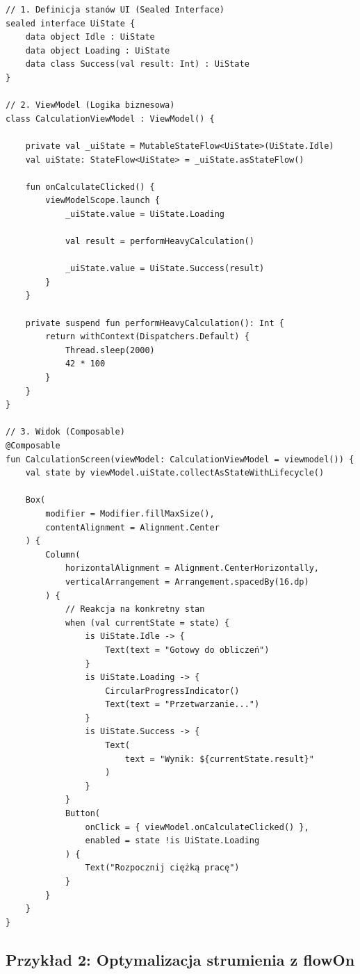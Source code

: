 \begin{verbatim}
// 1. Definicja stanów UI (Sealed Interface)
sealed interface UiState {
    data object Idle : UiState                    
    data object Loading : UiState                 
    data class Success(val result: Int) : UiState 
}

// 2. ViewModel (Logika biznesowa)
class CalculationViewModel : ViewModel() {

    private val _uiState = MutableStateFlow<UiState>(UiState.Idle)
    val uiState: StateFlow<UiState> = _uiState.asStateFlow()

    fun onCalculateClicked() {
        viewModelScope.launch {
            _uiState.value = UiState.Loading

            val result = performHeavyCalculation()

            _uiState.value = UiState.Success(result)
        }
    }

    private suspend fun performHeavyCalculation(): Int {
        return withContext(Dispatchers.Default) {
            Thread.sleep(2000) 
            42 * 100
        }
    }
}

// 3. Widok (Composable)
@Composable
fun CalculationScreen(viewModel: CalculationViewModel = viewmodel()) {
    val state by viewModel.uiState.collectAsStateWithLifecycle()

    Box(
        modifier = Modifier.fillMaxSize(),
        contentAlignment = Alignment.Center
    ) {
        Column(
            horizontalAlignment = Alignment.CenterHorizontally,
            verticalArrangement = Arrangement.spacedBy(16.dp)
        ) {
            // Reakcja na konkretny stan
            when (val currentState = state) {
                is UiState.Idle -> {
                    Text(text = "Gotowy do obliczeń")
                }
                is UiState.Loading -> {
                    CircularProgressIndicator()
                    Text(text = "Przetwarzanie...")
                }
                is UiState.Success -> {
                    Text(
                        text = "Wynik: ${currentState.result}"
                    )
                }
            }
            Button(
                onClick = { viewModel.onCalculateClicked() },
                enabled = state !is UiState.Loading
            ) {
                Text("Rozpocznij ciężką pracę")
            }
        }
    }
}
\end{verbatim}

\subsection{Przykład 2: Optymalizacja strumienia z flowOn}

